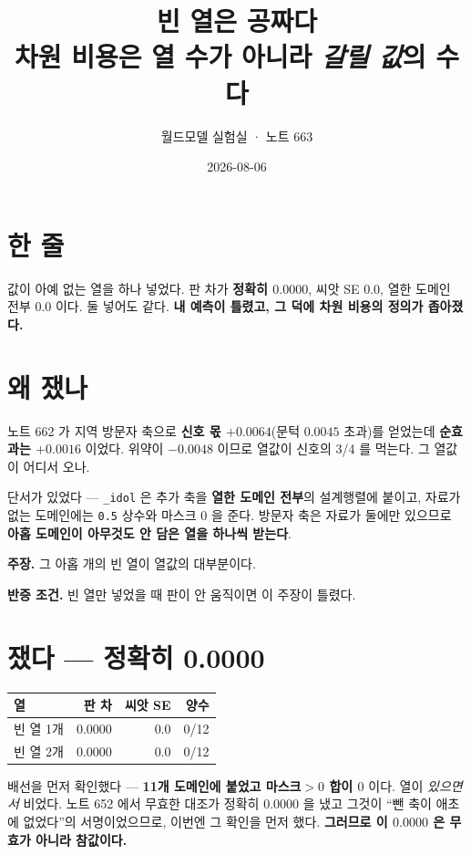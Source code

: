 \documentclass[10pt,a4paper]{article}
\title{\bfseries 빈 열은 공짜다\\[2pt]
\large 차원 비용은 열 수가 아니라 \emph{갈릴 값}의 수다}
\author{월드모델 실험실 · 노트 663}
\date{2026-08-06}
\newcommand{\claim}[2]{\begin{claimbox}\textbf{주장.} #1\par\smallskip
  \textcolor{gray!70}{\textbf{반증 조건.} #2}\end{claimbox}}
\begin{document}
\maketitle

\section{한 줄}

값이 아예 없는 열을 하나 넣었다. 판 차가 \textbf{정확히 $0.0000$}, 씨앗 SE
$0.0$, 열한 도메인 전부 $0.0$ 이다. 둘 넣어도 같다. \textbf{내 예측이 틀렸고,
그 덕에 차원 비용의 정의가 좁아졌다.}

\section{왜 쟀나}

노트 662 가 지역 방문자 축으로 \textbf{신호 몫 $+0.0064$}(문턱 $0.0045$ 초과)를
얻었는데 \textbf{순효과는 $+0.0016$} 이었다. 위약이 $-0.0048$ 이므로 열값이 신호의
3/4 를 먹는다. 그 열값이 어디서 오나.

단서가 있었다 --- \verb|_idol| 은 추가 축을 \textbf{열한 도메인 전부}의
설계행렬에 붙이고, 자료가 없는 도메인에는 \verb|0.5| 상수와 마스크 $0$ 을 준다.
방문자 축은 자료가 둘에만 있으므로 \textbf{아홉 도메인이 아무것도 안 담은 열을
하나씩 받는다}.

\claim{그 아홉 개의 빈 열이 열값의 대부분이다.}{빈 열만 넣었을 때 판이 안
움직이면 이 주장이 틀렸다.}

\section{쟀다 --- 정확히 0.0000}

\begin{center}\small
\begin{tabular}{lrrr}\toprule
열 & 판 차 & 씨앗 SE & 양수 \\ \midrule
빈 열 1개 & $\mathbf{0.0000}$ & $0.0$ & 0/12 \\
빈 열 2개 & $\mathbf{0.0000}$ & $0.0$ & 0/12 \\ \bottomrule
\end{tabular}\end{center}

배선을 먼저 확인했다 --- \textbf{11개 도메인에 붙었고 마스크${>}0$ 합이 $0$}
이다. 열이 \emph{있으면서} 비었다. 노트 652 에서 무효한 대조가 정확히 $0.0000$ 을
냈고 그것이 ``뺀 축이 애초에 없었다''의 서명이었으므로, 이번엔 그 확인을 먼저
했다. \textbf{그러므로 이 $0.0000$ 은 무효가 아니라 참값이다.}
\end{document}
